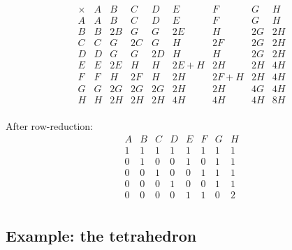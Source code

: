 \documentclass[11pt,oneside]{article}
\newcommand{\thinplus}{\!+\!}
\begin{document}
{\small
$$
\begin{array}{r|rrrrrrrr}
\times & A & B & C & D & E & F & G & H \\
\hline
A & A & B & C & D & E & F & G & H \\
B & B & 2B & G & G & 2E & H & 2G & 2H \\
C & C & G & 2C & G & H & 2F & 2G & 2H \\
D & D & G & G & 2D & H & H & 2G & 2H \\
E & E & 2E & H & H & 2E\thinplus H & 2H & 2H & 4H \\
F & F & H & 2F & H & 2H & 2F\thinplus H & 2H & 4H \\
G & G & 2G & 2G & 2G & 2H & 2H & 4G & 4H \\
H & H & 2H & 2H & 2H & 4H & 4H & 4H & 8H \\
\end{array}
$$
}

After row-reduction:
$$
\begin{array}{rrrrrrrr}
 A & B & C & D & E & F & G & H \\
\hline
1 & 1 & 1 & 1 & 1 & 1 & 1 & 1 \\
0 & 1 & 0 & 0 & 1 & 0 & 1 & 1 \\
0 & 0 & 1 & 0 & 0 & 1 & 1 & 1 \\
0 & 0 & 0 & 1 & 0 & 0 & 1 & 1 \\
0 & 0 & 0 & 0 & 1 & 1 & 0 & 2 \\
\end{array}
$$



\subsection{Example: the tetrahedron}
\end{document}
